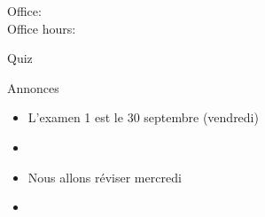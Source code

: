 \documentclass{beamer}
\subtitle[\lexi{Aller} et expressions temporelles]{Le verbe \lexi{aller} et les expressions temporelles}
\begin{document}
  \begin{frame}
    \titlepage
    \tiny{Office: \\
          Office hours: }
  \end{frame}

  \begin{frame}{}
    \begin{center}
      \Large Quiz
    \end{center}
  \end{frame}

  \begin{frame}{Annonces}
    \begin{itemize}
      \item L'examen 1 est le 30 septembre (vendredi)
      \item[] 
      \item Nous allons réviser mercredi
      \item[] 
    \end{itemize}
  \end{frame}
\end{document}
